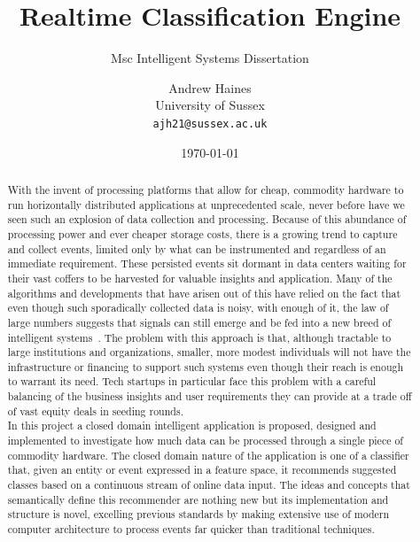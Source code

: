 \documentclass[a4paper,11pt]{scrreprt}
\begin{document}
\title{Realtime Classification Engine}
\subtitle{Msc Intelligent Systems Dissertation}
\author{Andrew Haines\\
	University of Sussex\\
	\texttt{ajh21@sussex.ac.uk}}

\date{\today}
\maketitle

\begin{abstract}
With the invent of processing platforms that allow for cheap, commodity hardware to run horizontally distributed applications at unprecedented scale, never before have we seen such an explosion of data collection and processing. Because of this abundance of processing power and ever cheaper storage costs, there is a growing trend to capture and collect events, limited only by what can be instrumented and regardless of an immediate requirement. These persisted events sit dormant in data centers waiting for their vast coffers to be harvested for valuable insights and application. Many of the algorithms and developments that have arisen out of this have relied on the fact that even though such sporadically collected data is noisy, with enough of it, the law of large numbers suggests that signals can still emerge and be fed into a new breed of intelligent systems~\cite{bigdata}. The problem with this approach is that, although tractable to large institutions and organizations, smaller, more modest individuals will not have the infrastructure or financing to support such systems even though their reach is enough to warrant its need. Tech startups in particular face this problem with a careful balancing of the business insights and user requirements they can provide at a trade off of vast equity deals in seeding rounds.\\

In this project a closed domain intelligent application is proposed, designed and implemented to investigate how much data can be processed through a single piece of commodity hardware. The closed domain nature of the application is one of a classifier that, given an entity or event expressed in a feature space, it recommends suggested classes based on a continuous stream of online data input. The ideas and concepts that semantically define this recommender are nothing new but its implementation and structure is novel, excelling previous standards by making extensive use of modern computer architecture to process events far quicker than traditional techniques.

\end{abstract}
\end{document}
